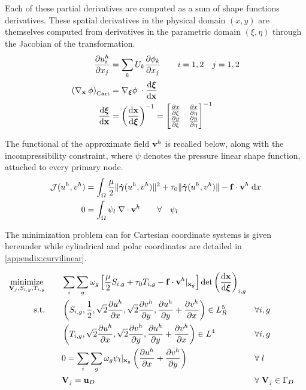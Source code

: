\documentclass[11 pt]{report}
\begin{document}
Each of these partial derivatives are computed as a sum of shape functions derivatives. These spatial derivatives in the physical domain $(x,y)$ are themselves computed from derivatives in the parametric domain $(\xi, \eta)$ through the Jacobian of the transformation.
\begin{align}
    \pdv{u^h_i}{x_j} &= \sum_k U_k \pdv{\phi_k}{x_j} \qquad i=1,2 \quad j=1,2\\
    \left(\nabla_{\mathbf{x}} \: \phi\right)_{\text{Cart}} &= \nabla_{\boldsymbol\xi} \phi \; \cdot \dv{\boldsymbol \xi}{\mathbf{x}}\\
    \dv{\boldsymbol \xi}{\mathbf{x}} &= \left(\dv{\mathbf{x}}{\boldsymbol \xi}\right)^{-1} = 
    \begin{bmatrix}
        \pdv{x}{\xi} & \pdv{x}{\eta}\\
        \pdv{y}{\xi} & \pdv{y}{\eta}\\
    \end{bmatrix}^{-1}
\end{align}

The functional of the approximate field $\mathbf{v}^h$ is recalled below, along with the incompressibility constraint, where $\psi$ denotes the pressure linear shape function, attached to every primary node.
\begin{align}
    \mathcal{J}(u^h, v^h) &= \int_{\Omega} \frac{\mu}{2} \|\boldsymbol{\dot \gamma}(u^h, v^h)\|^2 + \tau_0 \|\boldsymbol{\dot \gamma}(u^h, v^h)\| - \mathbf{f} \cdot \mathbf{v}^h \; \dd x\\
    0 &= \int_{\Omega} \psi_l \; \nabla \cdot \mathbf{v}^h \qquad \forall \quad \psi_l
\end{align}

The minimization problem can for Cartesian coordinate systems is given hereunder while cylindrical and polar coordinates are detailed in \cref{appendix:curvilinear}.
\begin{empheqboxed}
    \begin{equation}
        \begin{aligned}
            \operatorname*{minimize}_{\mathbf{V}_j, S_{i,g}, T_{i,g}} &\qquad \sum_{i}\sum_{g} \omega_g \left[\frac{\mu}{2} S_{i,g} + \tau_0 T_{i,g} - \mathbf{f} \cdot \mathbf{v}^h \vert_{\mathbf{x}_g} \right] \det \left(\dv{\mathbf{x}}{\boldsymbol \xi}\right)_{i,g}\\
            \textrm{s.t.} &\qquad \left(S_{i,g}, \frac{1}{2}, \sqrt{2}\pdv{u^h}{x}, \sqrt{2}\pdv{v^h}{y}, \pdv{u^h}{y}+\pdv{v^h}{x}\right) \in L_R^5 && \forall i, g\\
            &\qquad \left(T_{i,g}, \sqrt{2}\pdv{u^h}{x}, \sqrt{2}\pdv{v^h}{y}, \pdv{u^h}{y}+\pdv{v^h}{x}\right) \in L^4 && \forall i, g\\
            &\qquad 0 = \sum_i \sum_g \omega_g \psi_l \vert_{\mathbf{x}_g} \left(\pdv{u^h}{x} + \pdv{v^h}{y}\right) && \forall\; l\\
            &\qquad \mathbf{V}_{j} = \mathbf{u}_{D} && \forall\; \mathbf{V}_{j} \in \Gamma_D
        \end{aligned}
    \end{equation}
\end{empheqboxed}
\end{document}

